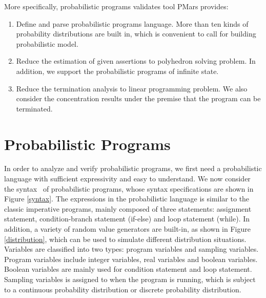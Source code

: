 More specifically, probabilistic programs validates tool PMars provides:
\begin{enumerate}
	\item Define and parse probabilistic programs language. More than ten kinds of probability distributions are built in, which is convenient to call for building probabilistic model.
	\item Reduce the estimation of given assertions to polyhedron solving problem. In addition, we support the probabilistic programs of infinite state.
	\item Reduce the termination analysis to linear programming problem. We also consider the concentration results under the premise that the program can be terminated.
\end{enumerate}

\section{Probabilistic Programs}

In order to analyze and verify probabilistic programs, we first need a probabilistic language with sufficient expressivity and easy to understand. We now consider the syntax~\cite{Minka2012Compiler} of probabilistic programs, whose syntax specifications are shown in Figure \ref{syntax}. The expressions in the probabilistic language is similar to the classic imperative programs, mainly composed of three statements: assignment statement, condition-branch statement (if-else) and loop statement (while). In addition, a variety of random value generators are built-in, as shown in Figure \ref{distribution}, which can be used to simulate different distribution situations. Variables are classified into two types: program variables and sampling variables. Program variables include integer variables, real variables and boolean variables. Boolean variables are mainly used for condition statement and loop statement. Sampling variables is assigned to when the program is running, which is subject to a continuous probability distribution or discrete probability distribution.

